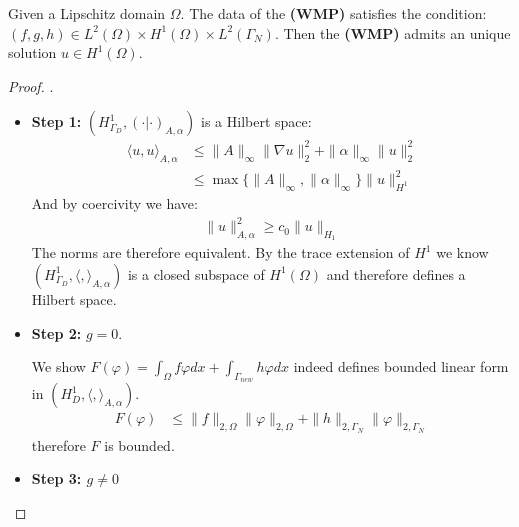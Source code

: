\begin{theorem}
	Given a Lipschitz domain $\Omega$. The data of the \textbf{(WMP)} satisfies the condition: $(f, g, h) \in L^2(\Omega) \times H^1(\Omega) \times L^2(\Gamma_N)$. Then the \textbf{(WMP)} admits an unique solution $u \in H^1(\Omega)$.
\end{theorem}
\begin{proof}.
\begin{itemize}
	\item \textbf{Step 1:} $(H^1_{\Gamma_D}, ( \cdot| \cdot )_{A, \alpha})$ is a Hilbert space:
	\begin{align*}
		\langle u, u \rangle_{A, \alpha} &\leq \|A\|_\infty \|\nabla u\|^2_2 + \|\alpha\|_\infty \|u\|_2^2\\
		&\leq \max\{\|A\|_\infty, \|\alpha\|_\infty\} \|u\|^2_{H^1}
	\end{align*} 
	And by coercivity we have:
	\begin{align*}
		\|u\|_{A, \alpha}^2 \geq c_0 \|u\|_{H_1}
	\end{align*}
	The norms are therefore equivalent. By the trace extension of $H^1$ we know $(H^1_{\Gamma_D}, \langle, \rangle_{A, \alpha})$ is a closed subspace of $H^1(\Omega)$ and therefore defines a Hilbert space.
	\item \textbf{Step 2:} $g = 0$. \par 
	We show $F(\varphi) = \int_\Omega f\varphi dx + \int_{\Gamma_{new}} h \varphi dx$ indeed defines bounded linear form in $(H^1_D, \langle, \rangle_{A, \alpha})$.
	\begin{align*}
		F(\varphi) &\leq \|f\|_{2, \Omega} \|\varphi\|_{2, \Omega} + \|h\|_{2, \Gamma_N} \|\varphi\|_{2, \Gamma_N}
	\end{align*}
	therefore $F$ is bounded.
	\item \textbf{Step 3: $g \neq 0$}
\end{itemize}	
\end{proof}


